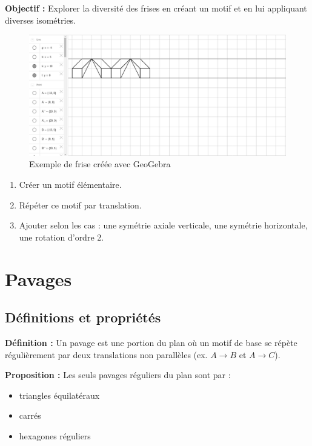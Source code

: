 \documentclass[12pt]{article}
\begin{document}
    \textbf{Objectif :} Explorer la diversité des frises en créant un motif et en lui appliquant diverses isométries.
    \begin{figure}[h!]
        \centering
        \includegraphics[width=\textwidth]{geogebra_frise.png}
        \caption{Exemple de frise créée avec GeoGebra}
    \end{figure}
    \begin{enumerate}
        \item Créer un motif élémentaire.
        \item Répéter ce motif par translation.
        \item Ajouter selon les cas : une symétrie axiale verticale, une symétrie horizontale, une rotation d’ordre 2.
    \end{enumerate}



    \section{Pavages}

    \subsection{Définitions et propriétés}

    \textbf{Définition :} Un pavage est une portion du plan où un motif de base se répète régulièrement par deux translations non parallèles (ex. \( A \rightarrow B \) et \( A \rightarrow C \)).

    \textbf{Proposition :} Les seuls pavages réguliers du plan sont par :
    \begin{itemize}
        \item triangles équilatéraux
        \item carrés
        \item hexagones réguliers
    \end{itemize}
\end{document}
